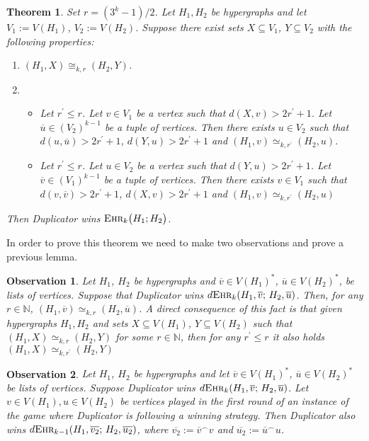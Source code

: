 \documentclass[12pt,notitlepage,a4paper]{article}
\newtheorem{theorem}{Theorem}[section]
\newtheorem{obs}{Observation}[section]
\theoremstyle{definition}
\newcommand{\N}{\mathbb{N}}
\newcommand{\ehr}{\textsc{Ehr}}
\begin{document}
\begin{theorem}\label{thm:DuplicatorAux}
	Set $r=(3^k-1)/2$.
	Let $H_1,H_2$ be hypergraphs and let $V_1:=V(H_1)$, $V_2:=
	V(H_2)$.
	Suppose there exist
	sets $X\subseteq V_1$, $Y\subseteq V_2$ with the 
	following properties:
	\begin{enumerate}
		\item[(1)] $(H_1,X)\cong_{k,r} (H_2,Y)$.
		\item[(2)]
		\begin{itemize}
			\item Let $r^\prime\leq r$. Let $v\in V_1$ be
			a vertex such that $d(X,v)> 2r^\prime + 1$. Let 
			$\overline{u}\in (V_2)^{k-1}$ be a tuple of vertices. 
			Then there exists $u\in V_2$ such that 
			$d(u,\overline{u})>2r^\prime+1$,
			$d(Y,u)>2r^\prime +1$ and
			$(H_1,v)\simeq_{k,r^\prime} (H_2,u)$.	
			\item Let $r^\prime\leq r$. Let $u\in V_2$ be
			a vertex such that $d(Y,u)> 2r^\prime + 1$. Let 
			$\overline{v}\in (V_1)^{k-1}$ be a tuple of vertices. 
			Then there exists $v\in V_1$ such that 
			$d(v,\overline{v})>2r^\prime+1$,
			$d(X,v)>2r^\prime +1$ and
			$(H_1,v)\simeq_{k,r^\prime} (H_2,u)$
		\end{itemize}
	\end{enumerate}
	Then Duplicator wins $\ehr_k\big(H_1;H_2\big)$.
\end{theorem}

In order to prove this theorem we need to make two observations
and prove a previous lemma. 

\begin{obs} \label{obs1}
	Let $H_1$, $H_2$ be hypergraphs and 
	$\overline{v}\in V(H_1)^*$, $\overline{u}\in V(H_2)^*$,
	be lists of vertices. Suppose that
	Duplicator wins $d\ehr_k(H_1,\overline{v}; \, H_2,\overline{u})$.
	Then, for any $r\in \N$, $(H_1, \overline{v})\simeq_{k,r} 
	(H_2,\overline{u})$. A direct consequence of this fact 
	is that 
	given hypergraphs $H_1, H_2$ and sets
	$X\subseteq V(H_1)$, $Y\subseteq V(H_2)$ such that
	$(H_1,X)\simeq_{k,r} (H_2,Y)$ for some $r\in \N$, 
	then for any $r^\prime \leq r$ it also holds 
	$(H_1,X)\simeq_{k,r^\prime} (H_2,Y)$
\end{obs}



\begin{obs} \label{obs2}
	Let $H_1$, $H_2$ be hypergraphs and let
	$\overline{v}\in V(H_1)^*$, $\overline{u}\in V(H_2)^*$ be lists of 
	vertices. Suppose 
	Duplicator wins $d\ehr_k(H_1,\overline{v};\,H_2,\overline{u})$. 
	Let $v\in V(H_1),u\in V(H_2)$ be vertices
	played in the first round of an instance of the game 
	where Duplicator is following a winning strategy. Then 
	Duplicator also wins $d\ehr_{k-1}(H_1,\overline{v_2}; \,
	H_2,\overline{u_2})$, where $\overline{v_2}:=\overline{v}^\smallfrown v$
	and $\overline{u_2}:=\overline{u}^\smallfrown u$.
\end{obs}
\end{document}
